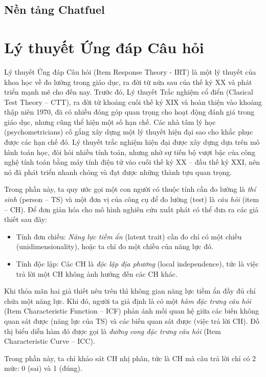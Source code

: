\subsection{Nền tảng Chatfuel}


\section{Lý thuyết Ứng đáp Câu hỏi}
Lý thuyết Ứng đáp Câu hỏi (Item Response Theory - IRT) là một lý thuyết của khoa học về đo lường trong giáo dục, ra đời từ nửa sau của thế kỷ XX và phát triển mạnh mẽ cho đến nay. Trước đó, Lý thuyết Trắc nghiệm cổ điển (Clasical Test Theory – CTT), ra đời từ khoảng cuối thế kỷ XIX và hoàn thiện vào khoảng thập niên 1970, đã có nhiều đóng góp quan trọng cho hoạt động đánh giá trong giáo dục, nhưng cũng thể hiện một số hạn chế. Các nhà tâm lý học (psychometricians) cố gắng xây dựng một lý thuyết hiện đại sao cho khắc phục được các hạn chế đó. Lý thuyết trắc nghiệm hiện đại được xây dựng dựa trên mô hình toán học, đòi hỏi nhiều tính toán, nhưng nhờ sự tiến bộ vượt bậc của công nghệ tính toán bằng máy tính điện tử vào cuối thế kỷ XX – đầu thế kỷ XXI, nên nó đã phát triển nhanh chóng và đạt được những thành tựu quan trọng.\par
Trong phần này, ta quy ước gọi một con người có thuộc tính cần đo lường là \textit{thí sinh} (person – TS) và một đơn vị của công cụ để đo lường (test) là \textit{câu hỏi} (item – CH). Để đơn giản hóa cho mô hình nghiên cứu xuất phát có thể đưa ra các giả thiết sau đây:\par
\begin{itemize}
	\item Tính đơn chiều: \textit{Năng lực tiềm ẩn} (latent trait) cần đo chỉ có một chiều (unidimensionality), hoặc ta chỉ đo một chiều của năng lực đó.
	\item Tính độc lập: Các CH là \textit{độc lập địa phương} (local independence), tức là việc trả lời một CH không ảnh hưởng đến các CH khác.
\end{itemize}\par
Khi thỏa mãn hai giả thiết nêu trên thì không gian năng lực tiềm ẩn đầy đủ chỉ chứa một năng lực. Khi đó, người ta giả định là có một \textit{hàm đặc trưng câu hỏi} (Item Characteristic Function – ICF) phản ánh mối quan hệ giữa các biến không quan sát được (năng lực của TS) và các biến quan sát được (việc trả lời CH). Đồ thị biểu diễn hàm đó được gọi là \textit{đường cong đặc trưng câu hỏi} (Item Characteristic Curve – ICC).\par
Trong phần này, ta chỉ khảo sát CH nhị phân, tức là CH mà câu trả lời chỉ có 2 mức: 0 (sai) và 1 (đúng).

